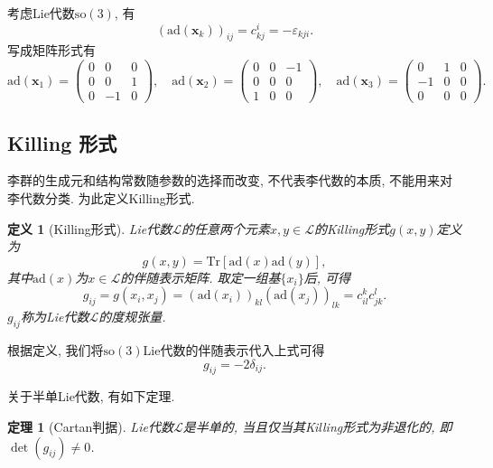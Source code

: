 \documentclass[UTF8]{ctexart}
\newtheorem{thm}{定理}
\newtheorem{define}{定义}
\begin{document}
考虑Lie代数$\mathrm{so}(3)$, 有
\begin{equation}
  (\mathrm{ad}(\bm{x}_k))_{ij} = c_{kj}^i = -\varepsilon_{kji}.
\end{equation}
写成矩阵形式有
\begin{equation}
  \mathrm{ad}(\bm{x}_1) =
  \begin{pmatrix}
    0 & 0 & 0 \\
    0 & 0 & 1 \\
    0 & -1 & 0
  \end{pmatrix}, \quad \mathrm{ad}(\bm{x}_2) =
  \begin{pmatrix}
    0 & 0 & -1 \\
    0 & 0 & 0 \\
    1 & 0 & 0
  \end{pmatrix}, \quad \mathrm{ad}(\bm{x}_3) =
  \begin{pmatrix}
    0 & 1 & 0 \\
    -1 & 0 & 0 \\
    0 & 0 & 0
  \end{pmatrix}.
\end{equation}

\subsection{Killing 形式}
李群的生成元和结构常数随参数的选择而改变, 不代表李代数的本质, 不能用来对李代数分类. 为此定义Killing形式.
\begin{define}[Killing形式]
  Lie代数$\mathcal{L}$的任意两个元素$x, y \in \mathcal{L}$的Killing形式$g(x,y)$定义为
  \begin{equation}
    g(x,y) = \mathrm{Tr}[\mathrm{ad}(x) \mathrm{ad}(y)],
  \end{equation}
其中$\mathrm{ad}(x)$为$x \in \mathcal{L}$的伴随表示矩阵. 取定一组基$\{x_i\}$后, 可得
\begin{equation}
  g_{ij}=g(x_i,x_j) = (\mathrm{ad}(x_i))_{kl}(\mathrm{ad}(x_j))_{lk} = c_{il}^kc_{jk}^l.
\end{equation}
$g_{ij}$称为Lie代数$\mathcal{L}$的度规张量.
\end{define}

根据定义, 我们将$\mathrm{so}(3)$Lie代数的伴随表示代入上式可得
\begin{equation}
  g_{ij} = -2\delta_{ij}.
\end{equation}

关于半单Lie代数, 有如下定理.
\begin{thm}[Cartan判据]
  Lie代数$\mathcal{L}$是半单的, 当且仅当其Killing形式为非退化的, 即$\det (g_{ij}) \neq 0$.
\end{thm}
\end{document}
